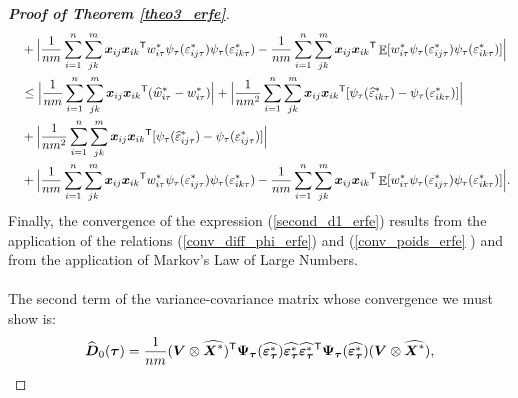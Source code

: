 \documentclass[15pt,a4paper]{article}
\DeclareMathOperator{\E}{\mathbb{E}}
\newcommand{\transpose}{{}^{\text{\sffamily T}}}
\begin{document}
\begin{proof}[\textbf{Proof of Theorem \ref{theo3_erfe}}]
\begin{align}
\begin{split}
& \quad  + \Big\lvert\frac{1}{nm}\sum_{i=1}^{n}\sum_{jk}^{m}\boldsymbol{x}_{ij}\boldsymbol{x}_{ik}\transpose w^{*}_{i\tau}\psi_{\tau}(\varepsilon^{*}_{ij\tau})\psi_{\tau}(\varepsilon^{*}_{ik\tau}) -  
        \frac{1}{nm}\sum_{i=1}^{n}\sum_{jk}^{m}\boldsymbol{x}_{ij}\boldsymbol{x}_{ik}\transpose\E[w^{*}_{i\tau}\psi_{\tau}(\varepsilon^{*}_{ij\tau})\psi_{\tau}(\varepsilon^{*}_{ik\tau})]\Big\rvert  \\
& \quad \leq \Big\lvert\frac{1}{nm}\sum_{i=1}^{n}\sum_{jk}^{m}\boldsymbol{x}_{ij}\boldsymbol{x}_{ik}\transpose (\widehat{w}^{*}_{i\tau}-w^{*}_{i\tau})\Big\rvert + 
        \Big\lvert\frac{1}{nm^2}\sum_{i=1}^{n}\sum_{jk}^{m}\boldsymbol{x}_{ij}\boldsymbol{x}_{ik}\transpose [\psi_{\tau}(\widehat{\varepsilon}^{*}_{ik\tau})-\psi_{\tau}(\varepsilon^{*}_{ik\tau})]\Big\rvert \\
& \quad + \Big\lvert\frac{1}{nm^2}\sum_{i=1}^{n}\sum_{jk}^{m}\boldsymbol{x}_{ij}\boldsymbol{x}_{ik}\transpose [\psi_{\tau}(\widehat{\varepsilon}^{*}_{ij\tau})-\psi_{\tau}(\varepsilon^{*}_{ij\tau})]\Big\rvert \\
& \quad  + \Big\lvert\frac{1}{nm}\sum_{i=1}^{n}\sum_{jk}^{m}\boldsymbol{x}_{ij}\boldsymbol{x}_{ik}\transpose
w^{*}_{i\tau}\psi_{\tau}(\varepsilon^{*}_{ij\tau})\psi_{\tau}(\varepsilon^{*}_{ik\tau}) - \frac{1}{nm}\sum_{i=1}^{n}\sum_{jk}^{m}\boldsymbol{x}_{ij}\boldsymbol{x}_{ik}\transpose\E[w^{*}_{i\tau}\psi_{\tau}(\varepsilon^{*}_{ij\tau})\psi_{\tau}(\varepsilon^{*}_{ik\tau})]\Big\rvert.  \\
\end{split}
\end{align}
Finally, the convergence of the expression (\ref{second_d1_erfe}) results from the application of the relations (\ref{conv_diff_phi_erfe}) and (\ref{conv_poids_erfe} ) and from the application of Markov's Law of Large Numbers.
~~\\
~~\\
The second term of the variance-covariance matrix whose convergence we must show is:
\begin{align*}
    \begin{split}
        \widehat{\boldsymbol{D}}_0(\boldsymbol{\tau})
        &=\frac{1}{nm}(\boldsymbol{V}\otimes\widehat{\boldsymbol{X}^{*}})\transpose\boldsymbol{\Psi}_{\boldsymbol{\tau}}(\widehat{\boldsymbol{\varepsilon}_{\boldsymbol{\tau}}^{*}})
        \widehat{\boldsymbol{\varepsilon}_{\boldsymbol{\tau}}^{*}}\widehat{\boldsymbol{\varepsilon}_{\boldsymbol{\tau}}^{*}}\transpose
        \boldsymbol{\Psi}_{\boldsymbol{\tau}}(\widehat{\boldsymbol{\varepsilon}_{\boldsymbol{\tau}}^{*}}) (\boldsymbol{V}\otimes\widehat{\boldsymbol{X}^{*}}), \\

\end{split}
\end{align*}
\end{proof}
\end{document}

